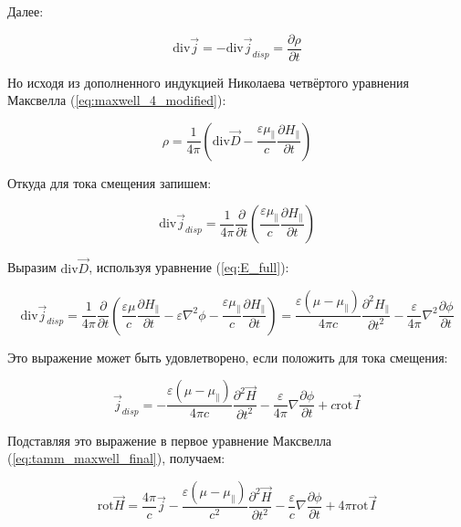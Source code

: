 \documentclass[12pt, a4paper]{article}
\begin{document}
Далее:

\begin{equation}
\text{div} \vec{j} = -\text{div} \vec{j}_{disp} = \frac{\partial \rho}{\partial t}
\label{eq:continuity_again}
\end{equation}

Но исходя из дополненного индукцией Николаева четвёртого уравнения Максвелла (\ref{eq:maxwell_4_modified}):

\begin{equation}
\rho = \frac{1}{4\pi} \left( \text{div} \vec{D} - \frac{\varepsilon \mu_{\parallel}}{c} \frac{\partial H_{\parallel}}{\partial t} \right)
\label{eq:rho_modified}
\end{equation}

Откуда для тока смещения запишем:

\begin{equation}
\text{div} \vec{j}_{disp} = \frac{1}{4\pi} \frac{\partial}{\partial t} \left( \frac{\varepsilon \mu_{\parallel}}{c} \frac{\partial H_{\parallel}}{\partial t} \right)
\label{eq:disp_current}
\end{equation}

Выразим $\text{div} \vec{D}$, используя уравнение (\ref{eq:E_full}):

\begin{equation}
\text{div} \vec{j}_{disp} = \frac{1}{4\pi} \frac{\partial}{\partial t} \left( \frac{\varepsilon \mu}{c} \frac{\partial H_{\parallel}}{\partial t} - \varepsilon \nabla^2 \phi - \frac{\varepsilon \mu_{\parallel}}{c} \frac{\partial H_{\parallel}}{\partial t} \right) = \frac{\varepsilon (\mu - \mu_{\parallel})}{4\pi c} \frac{\partial^2 H_{\parallel}}{\partial t^2} - \frac{\varepsilon}{4\pi} \nabla^2 \frac{\partial \phi}{\partial t}
\label{eq:disp_current_expanded}
\end{equation}

Это выражение может быть удовлетворено, если положить для тока смещения:

\begin{equation}
\vec{j}_{disp} = -\frac{\varepsilon (\mu - \mu_{\parallel})}{4\pi c} \frac{\partial^2 \vec{H}}{\partial t^2} - \frac{\varepsilon}{4\pi} \nabla \frac{\partial \phi}{\partial t} + c \text{rot} \vec{I}
\label{eq:disp_current_final}
\end{equation}

Подставляя это выражение в первое уравнение Максвелла (\ref{eq:tamm_maxwell_final}), получаем:

\begin{equation}
\text{rot} \vec{H} = \frac{4\pi}{c} \vec{j} - \frac{\varepsilon (\mu - \mu_{\parallel})}{c^2} \frac{\partial^2 \vec{H}}{\partial t^2} - \frac{\varepsilon}{c} \nabla \frac{\partial \phi}{\partial t} + 4\pi \text{rot} \vec{I}
\label{eq:maxwell_1_modified}
\end{equation}
\end{document}
